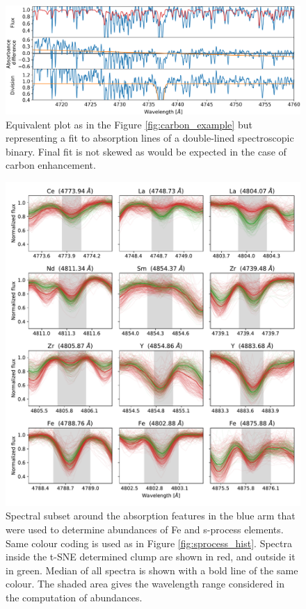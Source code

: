 \begin{figure}
	\centering
	\includegraphics[width=\textwidth]{bad_fit2_150603001801056.png}
	\caption{Equivalent plot as in the Figure \ref{fig:carbon_example} but representing a fit to absorption lines of a double-lined spectroscopic binary. Final fit is not skewed as would be expected in the case of carbon enhancement.}
	\label{fig:bad_fit2}
\end{figure}

\begin{figure}
	\centering
	\includegraphics[width=\textwidth]{sprocess_spectra.pdf}
	\caption{Spectral subset around the absorption features in the blue arm that were used to determine abundances of Fe and s-process elements. Same colour coding is used as in Figure \ref{fig:sprocess_hist}. Spectra inside the t-SNE determined clump are shown in red, and outside it in green. Median of all spectra is shown with a bold line of the same colour. The shaded area gives the wavelength range considered in the computation of abundances.}
	\label{fig:sprocess_spectrum}
\end{figure}

